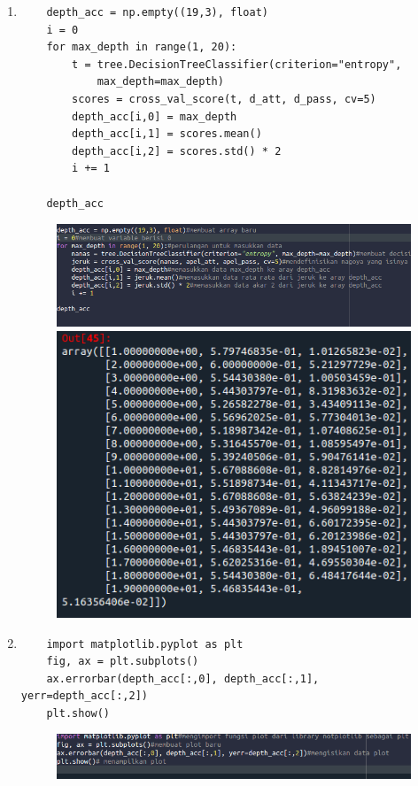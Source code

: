 \begin{enumerate}
\begin{figure}[!htbp]
	\end{figure}
\newpage
\item
\begin{verbatim}
	depth_acc = np.empty((19,3), float)
	i = 0
	for max_depth in range(1, 20):
	    t = tree.DecisionTreeClassifier(criterion="entropy", 
			max_depth=max_depth)
	    scores = cross_val_score(t, d_att, d_pass, cv=5)
	    depth_acc[i,0] = max_depth
	    depth_acc[i,1] = scores.mean()
	    depth_acc[i,2] = scores.std() * 2
	    i += 1

	depth_acc
\end{verbatim}
\begin{figure}[!htbp]
		\centering
		\includegraphics[scale=0.4]{figures/chapter2/chapter1.11.PNG}
		\includegraphics[scale=0.5]{figures/chapter2/hasilchapter1.11.PNG}
	\end{figure}
\newpage
\item 
\begin{verbatim}
	import matplotlib.pyplot as plt
	fig, ax = plt.subplots()
	ax.errorbar(depth_acc[:,0], depth_acc[:,1], yerr=depth_acc[:,2])
	plt.show()
\end{verbatim}
\begin{figure}[!htbp]
		\centering
		\includegraphics[scale=0.4]{figures/chapter2/chapter1.12.PNG}

\end{figure}
\end{enumerate}
